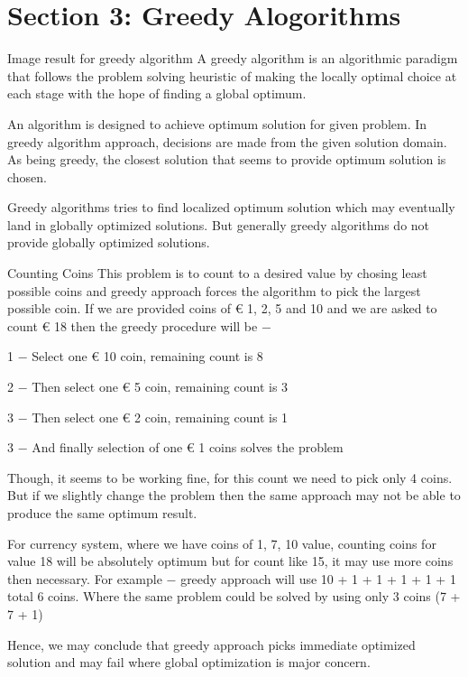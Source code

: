 \section{Section 3: Greedy Alogorithms}
\begin{frame}

Image result for greedy algorithm
A greedy algorithm is an algorithmic paradigm that follows the problem solving heuristic of making the locally optimal choice at each stage with the hope of finding a global optimum.

An algorithm is designed to achieve optimum solution for given problem. In greedy algorithm approach, decisions are made from the given solution domain. As being greedy, the closest solution that seems to provide optimum solution is chosen.

Greedy algorithms tries to find localized optimum solution which may eventually land in globally optimized solutions. But generally greedy algorithms do not provide globally optimized solutions.
\end{frame}
\begin{frame}
Counting Coins
This problem is to count to a desired value by chosing least possible coins and greedy approach forces the algorithm to pick the largest possible coin. If we are provided coins of € 1, 2, 5 and 10 and we are asked to count € 18 then the greedy procedure will be −

1 − Select one € 10 coin, remaining count is 8

2 − Then select one € 5 coin, remaining count is 3

3 − Then select one € 2 coin, remaining count is 1

3 − And finally selection of one € 1 coins solves the problem
\end{frame}
\begin{frame}

Though, it seems to be working fine, for this count we need to pick only 4 coins. But if we slightly change the problem then the same approach may not be able to produce the same optimum result.

For currency system, where we have coins of 1, 7, 10 value, counting coins for value 18 will be absolutely optimum but for count like 15, it may use more coins then necessary. For example − greedy approach will use 10 + 1 + 1 + 1 + 1 + 1 total 6 coins. Where the same problem could be solved by using only 3 coins (7 + 7 + 1)

Hence, we may conclude that greedy approach picks immediate optimized solution and may fail where global optimization is major concern.
\end{frame}
